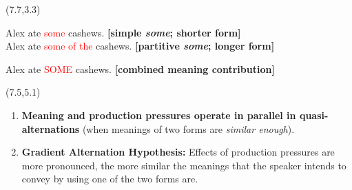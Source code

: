 \documentclass[a0,portrait]{a0poster}
\newcommand{\red}[1]{\textcolor{Red}{#1}}
\newcommand{\superlightgray}[1]{\textcolor{superlightgray}{#1}}
\def\LHead#1{\noindent{\LARGE\color{myBlue} #1}}
\begin{document}
\begin{textblock}{7}
\begin{textblock}{7.5}
\begin{textblock}{7.5}(7.7,3.3)

Alex ate \hspace{0.1cm} \red{some} \hspace{2.7cm} cashews. \hspace{5pt} 	\textbf{[simple \emph{some}; shorter form]}\\
Alex ate \hspace{0.1cm} \red{some of the} \hspace{0.05cm} cashews. \hspace{5pt}  \textbf{[partitive \emph{some}; longer form]}

Alex ate \hspace{0.1cm} \normalsize \red{SOME} \hspace{2.7cm} \large  cashews. \hspace{5pt} \textbf{[combined meaning contribution]}

\end{textblock}

\end{textblock}

\end{textblock}



\begin{textblock}{7.1}(7.5,5.1)
  \LHead{Hypotheses}

  \large

\begin{enumerate}
	\item \textbf{Meaning and production pressures operate in parallel in quasi-alternations} (when meanings of two forms are \emph{similar enough}).
	\item \textbf{Gradient Alternation Hypothesis:} Effects of production pressures are more pronounced, the more similar the meanings that the speaker intends to convey by using one of the two forms are.
\end{enumerate}
	
\end{textblock}
\end{document}
